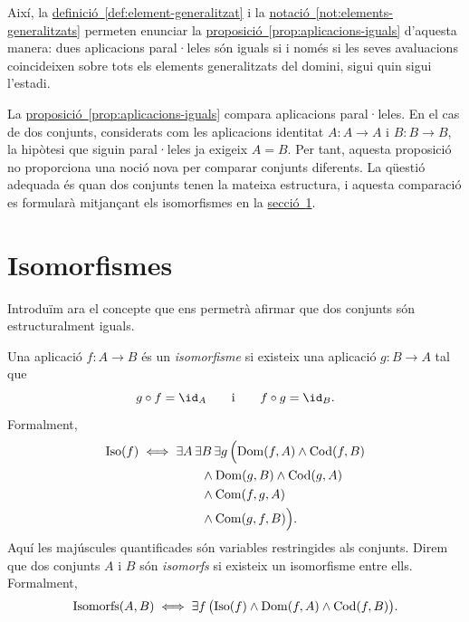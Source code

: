 Així, la \hyperref[def:element-generalitzat]{definició~\ref*{def:element-generalitzat}} i la \hyperref[not:elements-generalitzats]{notació~\ref*{not:elements-generalitzats}} permeten enunciar la \hyperref[prop:aplicacions-iguals]{proposició~\ref*{prop:aplicacions-iguals}} d'aquesta manera: dues aplicacions paral·leles són iguals si i només si les seves avaluacions coincideixen sobre tots els elements generalitzats del domini, sigui quin sigui l'estadi.

La \hyperref[prop:aplicacions-iguals]{proposició~\ref*{prop:aplicacions-iguals}} compara aplicacions paral·leles. En el cas de dos conjunts, considerats com les aplicacions identitat \(A:A\to A\) i \(B:B\to B\), la hipòtesi que siguin paral·leles ja exigeix \(A=B\). Per tant, aquesta proposició no proporciona una noció nova per comparar conjunts diferents. La qüestió adequada és quan dos conjunts tenen la mateixa estructura, i aquesta comparació es formularà mitjançant els isomorfismes en la \hyperref[sec:isomorfismes]{secció~\ref*{sec:isomorfismes}}.

\section{Isomorfismes}\label{sec:isomorfismes}

Introduïm ara el concepte que ens permetrà afirmar que dos conjunts són estructuralment iguals.

\begin{definicio}[Isomorfisme]\label{def:isomorfisme}
Una aplicació \(f:A\to B\) és un \emph{isomorfisme} si existeix una aplicació \(g:B\to A\) tal que
\[
g\circ f=\id_A
\qquad\text{i}\qquad
f\circ g=\id_B.
\]
Formalment,
\[
\begin{aligned}
\operatorname{Iso}(f)
\iff {}&
\exists A\,\exists B\,\exists g\,
\Bigl(
    \operatorname{Dom}(f,A)\land \operatorname{Cod}(f,B)
\\
&\qquad\land \operatorname{Dom}(g,B)\land \operatorname{Cod}(g,A)
\\
&\qquad\land \operatorname{Com}(f,g,A)
\\
&\qquad\land \operatorname{Com}(g,f,B)
\Bigr).
\end{aligned}
\]
Aquí les majúscules quantificades són variables restringides als conjunts. Direm que dos conjunts \(A\) i \(B\) són \emph{isomorfs} si existeix un isomorfisme entre ells. Formalment,
\[
\operatorname{Isomorfs}(A,B)
\iff
\exists f\,\bigl(
\operatorname{Iso}(f)\land\operatorname{Dom}(f,A)\land\operatorname{Cod}(f,B)
\bigr).
\]
\end{definicio}

